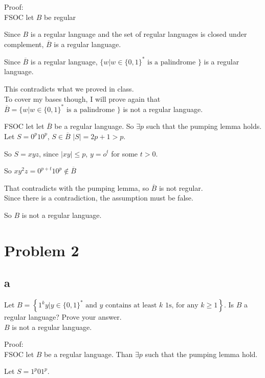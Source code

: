 \documentclass[letterpaper, 11pt]{article}
\begin{document}
Proof:\\

FSOC let $B$ be regular

Since $B$ is a regular language and the set of regular languages is closed under complement, $\overline{B}$ is a regular language.

Since $\overline{B}$ is a regular language, $\{ w | w \in \{ 0,1 \} ^ { * } \text { is a palindrome } \}$ is a regular language.

This contradicts what we proved in class.\\

To cover my bases though, I will prove again that $\overline{B} = \{ w | w \in \{ 0,1 \} ^ { * } \text { is a palindrome } \}$ is not a regular language.

FSOC let let $\overline{B}$ be a regular language.
So $\exists p$ such that the pumping lemma holds.\\

Let $S = 0^p10^p$, $S \in \overline{B}$ $|S| = 2p + 1 > p$.

So $S = xyz$, since $|xy| \leq p$, $y = o^t$ for some $t > 0$.

So $xy^2z = 0^{p + t}10^p \notin \overline{B}$

That contradicts with the pumping lemma, so $\overline{B}$ is not regular.\\

Since there is a contradiction, the assumption must be false.

So $B$ is not a regular language.

\newpage
\section*{Problem 2}
\subsection*{a}
Let $B = \left\{ 1 ^ { k } y | y \in \{ 0,1 \} ^ { * } \text { and } y \text { contains at least } k \text { 1s, for any } k \geq 1\right\}$. Is $B$ a regular language? Prove your answer.\\

$B$ is not a regular language.

Proof:\\

FSOC let $B$ be a regular language.
Than $\exists p$ such that the pumping lemma hold.

Let $S = 1^p01^p$. 
\end{document}
